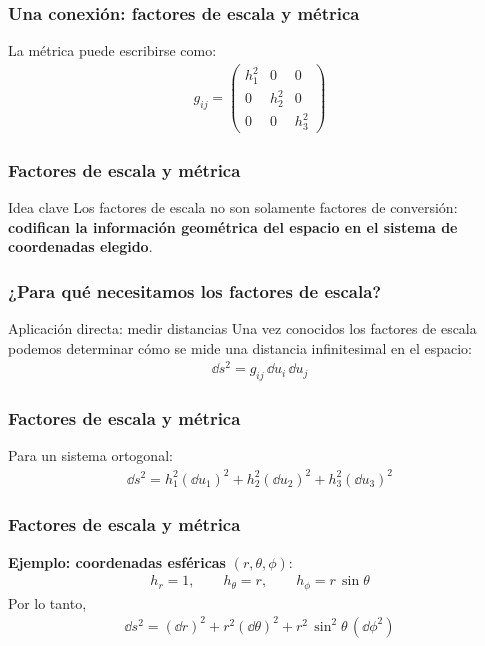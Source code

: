 \documentclass[12pt]{beamer}
\begin{document}
\begin{frame}
\frametitle{Una conexión: factores de escala y métrica}
La métrica puede escribirse como:
\pause
\begin{align*}
\boxed{ g_{ij} = \begin{pmatrix}
      h_{1}^{2} & 0 & 0 \\
      0 & h_{2}^{2} & 0 \\
      0 & 0 & h_{3}^{2}
   \end{pmatrix} }
\end{align*}
\end{frame}
\begin{frame}
\frametitle{Factores de escala y métrica}
\begin{alertblock}{Idea clave}
Los factores de escala no son solamente factores de conversión:
\textbf{codifican la información geométrica del espacio en el sistema de coordenadas elegido}.
\end{alertblock}
\end{frame}
\begin{frame}
\frametitle{¿Para qué necesitamos los factores de escala?}
\begin{exampleblock}{Aplicación directa: medir distancias}
Una vez conocidos los factores de escala podemos determinar
cómo se mide una distancia infinitesimal en el espacio:
\begin{align*}
   \dd{s^{2}} = g_{ij} \, \dd{u_{i}} \, \dd{u_{j}}
\end{align*}
\end{exampleblock}
\end{frame}
\begin{frame}
\frametitle{Factores de escala y métrica}
Para un sistema ortogonal:
\begin{align*}
\boxed{\dd{s}^{2} = h_{1}^{2} (\dd{u_{1}})^{2} + h_{2}^{2} (\dd{u_{2}})^{2} + h_{3}^{2} (\dd{u_{3}})^{2}}
\end{align*}
\end{frame}
\begin{frame}
\frametitle{Factores de escala y métrica}
\textbf{Ejemplo: coordenadas esféricas} $(r, \theta, \phi)$:
\begin{align*}
      h_{r} = 1, \qquad h_{\theta} = r, \qquad h_{\phi} = r \, \sin \theta
\end{align*}
\pause
Por lo tanto,
\begin{align*}
   \boxed{ \dd{s^{2} = (\dd{r})^{2}} + r^{2} (\dd{\theta})^2 + r^{2} \, \sin^{2} \theta \, (\dd{\phi}^{2})
         }
\end{align*}
\end{frame}
\end{document}

